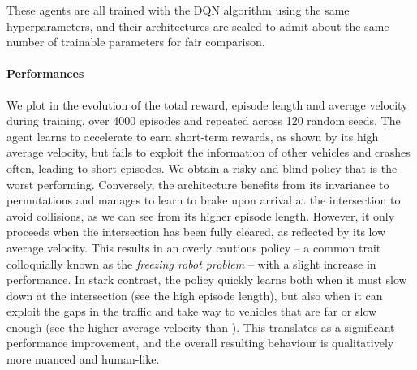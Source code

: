 These agents are all trained with the \gls{DQN} algorithm using the same hyperparameters, and their architectures are scaled to admit about the same number of trainable parameters for fair comparison.

\paragraph{Performances}

We plot in  the evolution of the total reward, episode length and average velocity during training, over 4000 episodes and repeated across 120 random seeds.
The \MLPL agent learns to accelerate to earn short-term rewards, as shown by its high average velocity, but fails to exploit the information of other vehicles and crashes often, leading to short episodes. We obtain a risky and blind policy that is the worst performing.
Conversely, the \CNNG architecture benefits from its invariance to permutations and manages to learn to brake upon arrival at the intersection to avoid collisions, as we can see from its higher episode length. However, it only proceeds when the intersection has been fully cleared, as reflected by its low average velocity. This results in an overly cautious policy -- a common trait colloquially known as the \emph{freezing robot problem} \citep{Trautman2010} -- with a slight increase in performance.
In stark contrast, the \EgoAtt policy quickly learns both when it must slow down at the intersection (see the high episode length), but also when it can exploit the gaps in the traffic and take way to vehicles that are far or slow enough (see the higher average velocity than \CNNG). This translates as a significant performance improvement, and the overall resulting behaviour is qualitatively more nuanced and human-like.

